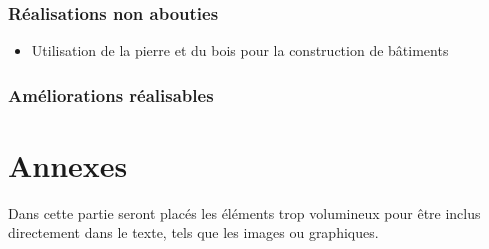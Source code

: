 \documentclass[a4paper]{article}
\newcommand{\alinea}{\hspace*{0.5cm}}
\begin{document}
	\section{Réalisations non abouties}
		\begin{itemize}
			\item Utilisation de la pierre et du bois pour la construction de bâtiments
		\end{itemize}
	\section{Améliorations réalisables}
		

  \newpage
  \part{Annexes}
    \alinea Dans cette partie seront placés les éléments trop volumineux pour être inclus directement dans le texte, tels que les images ou graphiques.\\
    
\end{document}
